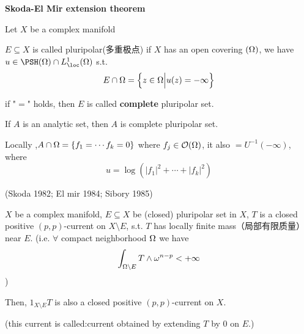 \textbf{Skoda-El Mir extension theorem}

Let $X$ be a complex manifold

\begin{definition}
$E\subseteq X$ is called pluripolar(多重极点) if 
$X$ has an open covering $(\Omega)$, we have 
$u\in\PSH(\Omg)\cap L^1_{\loc}(\Omg)$ s.t.
$$E\cap\Omega=\Big\{ z\in\Omega \Big| u(z)=-\infty \Big\}$$
\end{definition}

if "$=$" holds, then $E$ is called \textbf{complete} pluripolar set.

\begin{example}
If $A$ is an analytic set, then $A$ is complete pluripolar set.
\end{example}

Locally ,$A\cap\Omega=\{f_1=\cdots f_k=0\}$ where $f_j\in\mathcal{O}(\Omega)$,
it also $= U^{-1}(-\infty)$, where
$$u=\log(|f_1|^2+\cdots+|f_k|^2)$$

\begin{thm}(Skoda 1982; El mir 1984; Sibory 1985)

$X$ be a complex manifold, $E\subseteq X$ be (closed) pluripolar set in $X$,
$T$ is a closed positive $(p,p)$-current on $X\setminus E$,
s.t. $T$ has locally finite mass（局部有限质量） near $E$.
(i.e. $\forall$ compact neighborhood $\Omega$ we have 
$$\int_{\Omega\setminus E}T\wedge\omega^{n-p}<+\infty$$
)

Then, $1_{X\setminus E}T$ is also a closed positive $(p,p)$-current on $X$.
\end{thm}
(this current is called:current obtained by extending $T$ by $0$ on $E$.)

